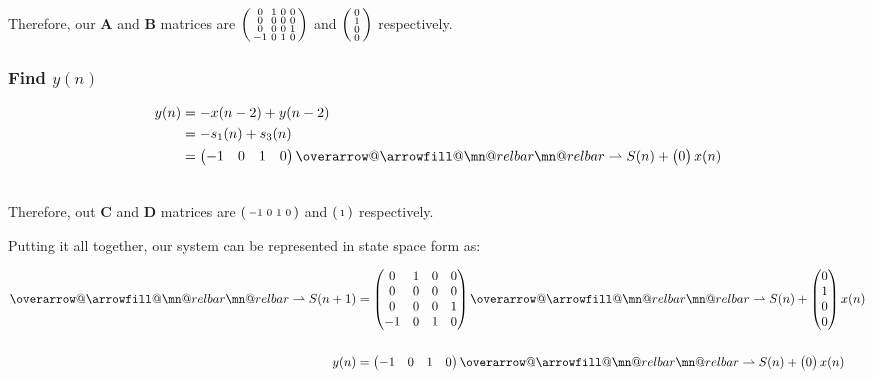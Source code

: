 \documentclass{article}
\makeatletter
\newenvironment{directsubsubs}{
  \makeatletter
  \renewcommand\thesubsubsection{\thesection.\Roman{subsubsection}}
  \makeatother
}{
  \makeatletter
  \renewcommand\thesubsubsection{\thesubsection.\Roman{subsubsection}}
  \makeatother
}
\renewcommand{\thesubsection}{\thesection.\alph{subsection}}
\renewcommand{\thesubsubsection}{\thesection.\alph{subsection}.\Roman{subsubsection}}
\DeclareRobustCommand{\overrightharpoon}{\mathpalette{\overarrow@\rightharpoonfill@}}
\def\rightharpoonfill@{\arrowfill@\mn@relbar\mn@relbar\rightharpoonup}
\makeatother
\begin{document}
\begin{directsubsubs}
Therefore, our $\boldsymbol{A}$ and $\boldsymbol{B}$ matrices are $\begin{psmallmatrix} 0 & 1 & 0 & 0 \\ 0 & 0 & 0 & 0 \\ 0 & 0 & 0 & 1 \\ -1 & 0 & 1 & 0 \end{psmallmatrix}$ and $\begin{psmallmatrix} 0 \\ 1 \\ 0 \\ 0 \end{psmallmatrix}$ respectively.

\subsubsection[~\thesubsubsection]{Find $y(n)$}

\begin{align*}
	y(n) &= -x(n - 2) + y(n - 2) \\
	&= -s_1(n) + s_3(n) \\
	&= \begin{pmatrix} -1 & 0 & 1 & 0 \end{pmatrix}\overrightharpoon{S(n)} + \begin{pmatrix} 0 \end{pmatrix}x(n) \\\\
\end{align*}

Therefore, out $\boldsymbol{C}$ and $\boldsymbol{D}$ matrices are $\begin{psmallmatrix} -1 & 0 & 1 & 0 \end{psmallmatrix}$ and $\begin{psmallmatrix} 1 \end{psmallmatrix}$ respectively.

Putting it all together, our system can be represented in state space form as:

\begin{align*}
	\overrightharpoon{S(n + 1)} &= \begin{pmatrix} 0 & 1 & 0 & 0 \\ 0 & 0 & 0 & 0 \\ 0 & 0 & 0 & 1 \\ -1 & 0 & 1 & 0 \end{pmatrix}\overrightharpoon{S(n)} + \begin{pmatrix} 0 \\ 1 \\ 0 \\ 0 \end{pmatrix}x(n) \\\\
	y(n) &= \begin{pmatrix} -1 & 0 & 1 & 0 \end{pmatrix}\overrightharpoon{S(n)} + \begin{pmatrix} 0 \end{pmatrix}x(n) \\
\end{align*}

\end{directsubsubs}
\end{document}
